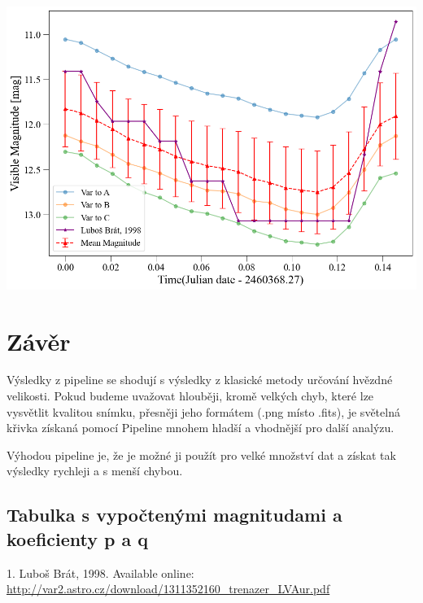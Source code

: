\documentclass[a4paper,11pt]{article}
\begin{document}
\begin{minipage}[t]{0.5\textwidth}
                \vspace{10pt}   
                \par \centering
                \includegraphics[scale=0.32]{lc}
                \captionsetup{justification=centering, font=footnotesize}
                \label{fig:apert}
                \vspace{10pt}
                \raggedright 
        \section{Závěr}
                Výsledky z pipeline se shodují s výsledky z klasické metody určování hvězdné velikosti. Pokud budeme uvažovat hlouběji, kromě velkých chyb, které lze vysvětlit kvalitou snímku, přesněji jeho formátem (.png místo .fits), je světelná křivka získaná pomocí Pipeline mnohem hladší a vhodnější pro další analýzu.  
                \par Výhodou pipeline je, že je možné ji použít pro velké množství dat a získat tak výsledky rychleji a s menší chybou. 
    \end{minipage}
\newpage    
            \begin{center}
                \subsection{Tabulka s vypočtenými magnitudami a koeficienty p a q}
            \end{center}
\begin{thebibliography}{9}
        1. Luboš Brát, 1998. Available online: \url{http://var2.astro.cz/download/1311352160_trenazer_LVAur.pdf}
\end{thebibliography}
\end{document}
